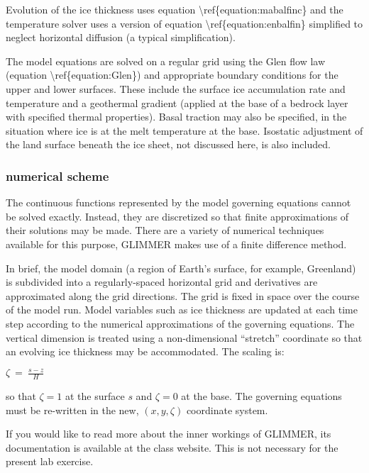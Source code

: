 Evolution of the ice thickness uses equation
\textbackslash{}ref\{equation:mabalfinc\} and the temperature solver
uses a version of equation \textbackslash{}ref\{equation:enbalfin\}
simplified to neglect horizontal diffusion (a typical simplification).

The model equations are solved on a regular grid using the Glen flow law
(equation \textbackslash{}ref\{equation:Glen\}) and appropriate boundary
conditions for the upper and lower surfaces. These include the surface
ice accumulation rate and temperature and a geothermal gradient (applied
at the base of a bedrock layer with specified thermal properties). Basal
traction may also be specified, in the situation where ice is at the
melt temperature at the base. Isostatic adjustment of the land surface
beneath the ice sheet, not discussed here, is also included.

\subsubsection{numerical scheme}

The continuous functions represented by the model governing equations
cannot be solved exactly. Instead, they are discretized so that finite
approximations of their solutions may be made. There are a variety of
numerical techniques available for this purpose, GLIMMER makes use of a
finite difference method.

In brief, the model domain (a region of Earth's surface, for example,
Greenland) is subdivided into a regularly-spaced horizontal grid and
derivatives are approximated along the grid directions. The grid is
fixed in space over the course of the model run. Model variables such as
ice thickness are updated at each time step according to the numerical
approximations of the governing equations. The vertical dimension is
treated using a non-dimensional ``stretch'' coordinate so that an
evolving ice thickness may be accommodated. The scaling is:

$
\zeta~=~\frac{s-z}{H}
$

so that $\zeta=1$ at the surface $s$ and $\zeta=0$ at the base. The
governing equations must be re-written in the new, $(x, y, \zeta)$
coordinate system.

If you would like to read more about the inner workings of GLIMMER, its
documentation is available at the class website. This is not necessary
for the present lab exercise.






